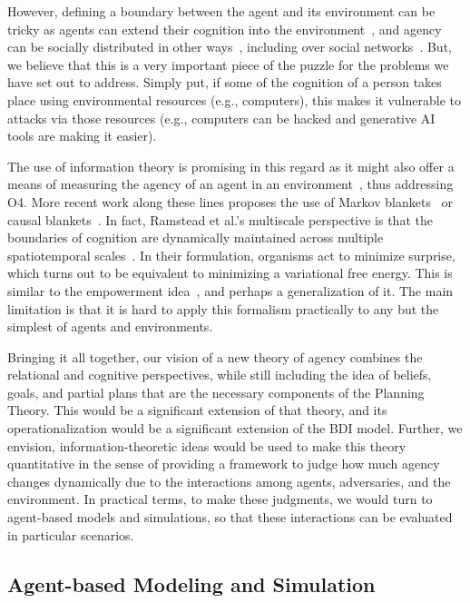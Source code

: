 However, defining a boundary between the agent and its environment can be tricky as agents can extend their cognition into the
environment~\cite[e.g.,][]{williams10infoDynamics}, and agency can be socially distributed in other ways~\citep{gasser91social}, including
over social networks~\citep{Tasselli2021, Mehrab2024}. But, we believe that this is a very important piece of the puzzle for the problems
we have set out to address. Simply put, if some of the cognition of a person takes place using environmental resources (e.g., computers),
this makes it vulnerable to attacks via those resources (e.g., computers can be hacked and generative AI tools are making it easier).

The use of information theory is promising in this regard as it might also offer a means of measuring the agency of an agent in an 
environment~\citep{jung11empowerment}, thus addressing O4. More recent work along these lines proposes the use of Markov 
blankets~\citep{ramstead2021multiscale} or causal blankets~\citep{rosas20causal}. In fact, Ramstead et al.'s multiscale perspective is that
the boundaries of cognition are dynamically maintained across multiple spatiotemporal scales~\citep{ramstead2021multiscale}. In their 
formulation, organisms act to minimize surprise, which turns out to be equivalent to minimizing a variational free energy. This is similar to
the empowerment idea~\citep{jung11empowerment}, and perhaps a generalization of it. The main limitation is that it is hard to apply this
formalism practically to any but the simplest of agents and environments.

Bringing it all together, our vision of a new theory of agency combines the relational and cognitive perspectives, while still including
the idea of beliefs, goals, and partial plans that are the necessary components of the Planning Theory. This would be a significant
extension of that theory, and its operationalization would be a significant extension of the BDI model. Further, we envision, 
information-theoretic ideas would be used to make this theory quantitative in the sense of providing a framework to judge how much agency changes
dynamically due to the interactions among agents, adversaries, and the environment. In practical terms, to make these judgments, we would
turn to agent-based models and simulations, so that these interactions can be evaluated in particular scenarios.

\subsection{Agent-based Modeling and Simulation}

